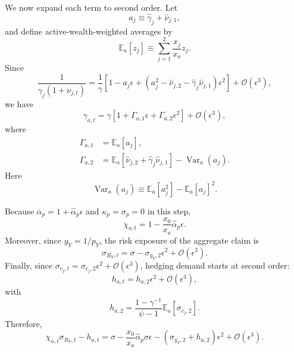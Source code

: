 We now expand each term to second order.
Let
\begin{equation}
    a_j \equiv \hat{\gamma}_j+\hat{\nu}_{j,1},
\end{equation}
and define active-wealth-weighted averages by
\begin{equation}
    \mathbb{E}_a[z_j]\equiv \sum_{j=1}^2 \frac{x_j}{x_a}z_j.
\end{equation}
Since
\begin{equation}
    \frac{1}{\gamma_j(1+\nu_{j,t})}
    = \frac{1}{\gamma}\left[1-a_j\epsilon+
    \left(a_j^2-\hat{\nu}_{j,2}-\hat{\gamma}_j\hat{\nu}_{j,1}\right)\epsilon^2\right]
    +\mathcal{O}(\epsilon^3),
\end{equation}
we have
\begin{equation}
    \gamma_{a,t}=\gamma\left[1+\Gamma_{a,1}\epsilon+\Gamma_{a,2}\epsilon^2\right]+\mathcal{O}(\epsilon^3),
\end{equation}
where
\begin{align}
    \Gamma_{a,1} &= \mathbb{E}_a[a_j],\\
    \Gamma_{a,2} &= \mathbb{E}_a[\hat{\nu}_{j,2}+\hat{\gamma}_j\hat{\nu}_{j,1}]
    -\operatorname{Var}_a(a_j).
\end{align}
Here
\begin{equation}
    \operatorname{Var}_a(a_j) \equiv \mathbb{E}_a[a_j^2]-\mathbb{E}_a[a_j]^2.
\end{equation}

Because $\overline{\alpha}_p=1+\hat{\alpha}_p\epsilon$ and $\kappa_p=\sigma_p=0$ in this step,
\begin{equation}
    \chi_{a,t}=1-\frac{x_0}{x_a}\hat{\alpha}_p\epsilon.
\end{equation}
Moreover, since $y_Y=1/p_Y$, the risk exposure of the aggregate claim is
\begin{equation}
    \sigma_{R_Y,t}=\sigma-\sigma_{y_Y,2}\epsilon^2+\mathcal{O}(\epsilon^3).
\end{equation}
Finally, since $\sigma_{c_j,t}=\sigma_{c_j,2}\epsilon^2+\mathcal{O}(\epsilon^3)$, hedging demand starts at second order:
\begin{equation}
    h_{a,t}=h_{a,2}\epsilon^2+\mathcal{O}(\epsilon^3),
\end{equation}
with
\begin{equation}
    h_{a,2}=\frac{1-\gamma^{-1}}{\psi-1}\mathbb{E}_a[\sigma_{c_j,2}].
\end{equation}
Therefore,
\begin{equation}
    \chi_{a,t}\sigma_{R_Y,t}-h_{a,t}
    = \sigma - \frac{x_0}{x_a}\hat{\alpha}_p\sigma\epsilon
    -\left(\sigma_{y_Y,2}+h_{a,2}\right)\epsilon^2
    +\mathcal{O}(\epsilon^3).
\end{equation}

